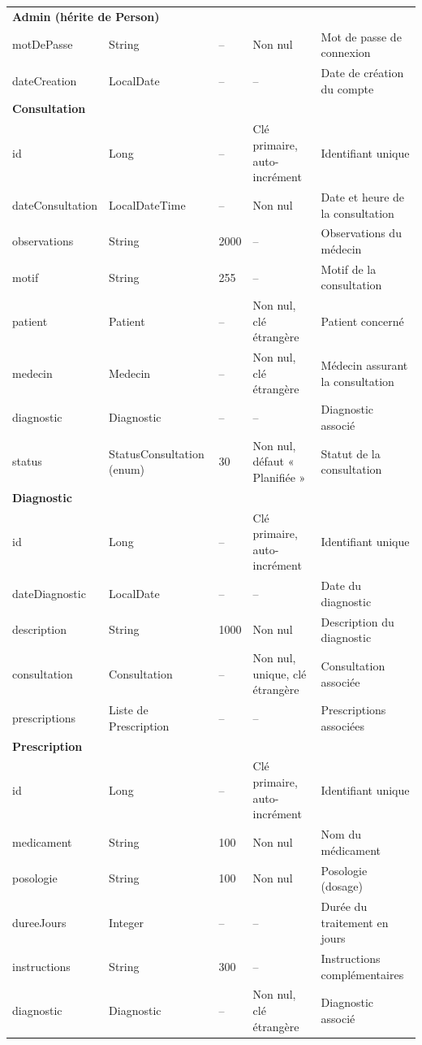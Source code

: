 \begin{center}
\begin{longtable}{p{2.7cm} p{2.6cm} p{1.5cm} p{3.4cm} p{5.2cm}}
\multicolumn{5}{l}{\textbf{Admin (hérite de Person)}} \\
motDePasse & String & -- & Non nul & Mot de passe de connexion \\
dateCreation & LocalDate & -- & -- & Date de création du compte \\
\midrule

\multicolumn{5}{l}{\textbf{Consultation}} \\
id & Long & -- & Clé primaire, auto-incrément & Identifiant unique \\
dateConsultation & LocalDateTime & -- & Non nul & Date et heure de la consultation \\
observations & String & 2000 & -- & Observations du médecin \\
motif & String & 255 & -- & Motif de la consultation \\
patient & Patient & -- & Non nul, clé étrangère & Patient concerné \\
medecin & Medecin & -- & Non nul, clé étrangère & Médecin assurant la consultation \\
diagnostic & Diagnostic & -- & -- & Diagnostic associé \\
status & StatusConsultation (enum) & 30 & Non nul, défaut « Planifiée » & Statut de la consultation \\
\midrule

\multicolumn{5}{l}{\textbf{Diagnostic}} \\
id & Long & -- & Clé primaire, auto-incrément & Identifiant unique \\
dateDiagnostic & LocalDate & -- & -- & Date du diagnostic \\
description & String & 1000 & Non nul & Description du diagnostic \\
consultation & Consultation & -- & Non nul, unique, clé étrangère & Consultation associée \\
prescriptions & Liste de Prescription & -- & -- & Prescriptions associées \\
\midrule

\multicolumn{5}{l}{\textbf{Prescription}} \\
id & Long & -- & Clé primaire, auto-incrément & Identifiant unique \\
medicament & String & 100 & Non nul & Nom du médicament \\
posologie & String & 100 & Non nul & Posologie (dosage) \\
dureeJours & Integer & -- & -- & Durée du traitement en jours \\
instructions & String & 300 & -- & Instructions complémentaires \\
diagnostic & Diagnostic & -- & Non nul, clé étrangère & Diagnostic associé \\
\bottomrule
\end{longtable}
\end{center}

